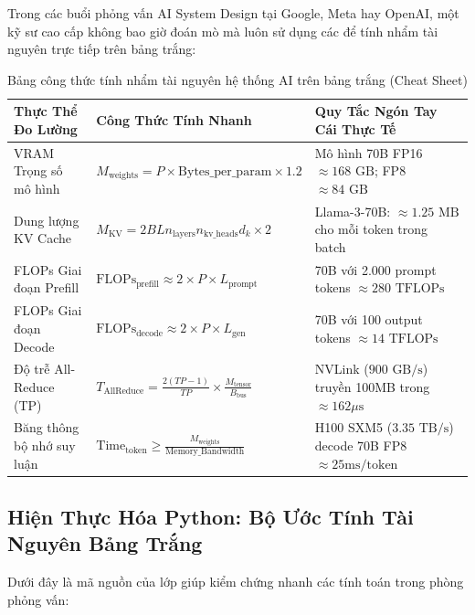 Trong các buổi phỏng vấn AI System Design tại Google, Meta hay OpenAI, một kỹ sư cao cấp không bao giờ đoán mò mà luôn sử dụng các  để tính nhẩm tài nguyên trực tiếp trên bảng trắng:

\begin{table}[htbp]
\centering
\footnotesize
\caption{Bảng công thức tính nhẩm tài nguyên hệ thống AI trên bảng trắng (Cheat Sheet)}
\label{tab:back-of-the-envelope-formulas}
\begin{tabular}{p{3.4cm} p{5.5cm} p{6.0cm}}
\toprule
\textbf{Thực Thể Đo Lường} & \textbf{Công Thức Tính Nhanh} & \textbf{Quy Tắc Ngón Tay Cái Thực Tế} \\
\midrule
VRAM Trọng số mô hình & $M_{\text{weights}} = P \times \text{Bytes\_per\_param} \times 1.2$ & Mô hình 70B FP16 $\approx 168\text{ GB}$; FP8 $\approx 84\text{ GB}$ \\
Dung lượng KV Cache & $M_{\text{KV}} = 2 B L n_{\text{layers}} n_{\text{kv\_heads}} d_k \times 2$ & Llama-3-70B: $\approx 1.25\text{ MB}$ cho mỗi token trong batch \\
FLOPs Giai đoạn Prefill & $\text{FLOPs}_{\text{prefill}} \approx 2 \times P \times L_{\text{prompt}}$ & 70B với 2.000 prompt tokens $\approx 280\text{ TFLOPs}$ \\
FLOPs Giai đoạn Decode & $\text{FLOPs}_{\text{decode}} \approx 2 \times P \times L_{\text{gen}}$ & 70B với 100 output tokens $\approx 14\text{ TFLOPs}$ \\
Độ trễ All-Reduce (TP) & $T_{\text{AllReduce}} = \frac{2(TP - 1)}{TP} \times \frac{M_{\text{tensor}}}{B_{\text{bus}}}$ & NVLink ($900\text{ GB/s}$) truyền 100MB trong $\approx 162\mu\text{s}$ \\
Băng thông bộ nhớ suy luận & $\text{Time}_{\text{token}} \ge \frac{M_{\text{weights}}}{\text{Memory\_Bandwidth}}$ & H100 SXM5 ($3.35\text{ TB/s}$) decode 70B FP8 $\approx 25\text{ms/token}$ \\
\bottomrule
\end{tabular}
\end{table}

\subsection{Hiện Thực Hóa Python: Bộ Ước Tính Tài Nguyên Bảng Trắng}
Dưới đây là mã nguồn của lớp  giúp kiểm chứng nhanh các tính toán trong phòng phỏng vấn:

